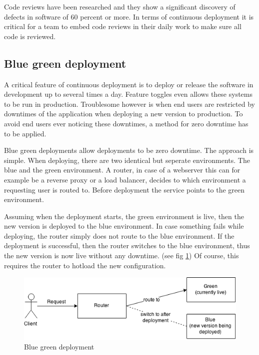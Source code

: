 Code reviews have been researched and they show a significant discovery of
defects in software of 60 percent or more. In terms of continuous deployment it
is critical for a team to embed code reviews in their daily work to make sure
all code is reviewed.

\subsection{Blue green deployment}

A critical feature of continuous deployment is to deploy or release the
software in development up to several times a day. Feature toggles even allows
these systems to be run in production. Troublesome however is when end users
are restricted by downtimes of the application when deploying a new version to
production. To avoid end users ever noticing these downtimes, a method for zero
downtime has to be applied.

Blue green deployments allow deployments to be zero downtime. The approach is
simple. When deploying, there are two identical but seperate environments. The
blue and the green environment. A router, in case of a webserver this can for
example be a reverse proxy or a load balancer, decides to which environment a
requesting user is routed to. Before deployment the service points to the green
environment.

Assuming when the deployment starts, the green environment is live, then the
new version is deployed to the blue environment. In case something fails while
deploying, the router simply does not route to the blue environment. If the
deployment is successful, then the router switches to the blue environment,
thus the new version is now live without any downtime. (see fig
\ref{fig:blue_green_deployment}) Of course, this requires the router to hotload the
new configuration.

\begin{figure}
  \includegraphics[scale=0.55]{pictures/blue_green_deployment.png}
  \caption{Blue green deployment}
  \centering
  \label{fig:blue_green_deployment}
\end{figure}

